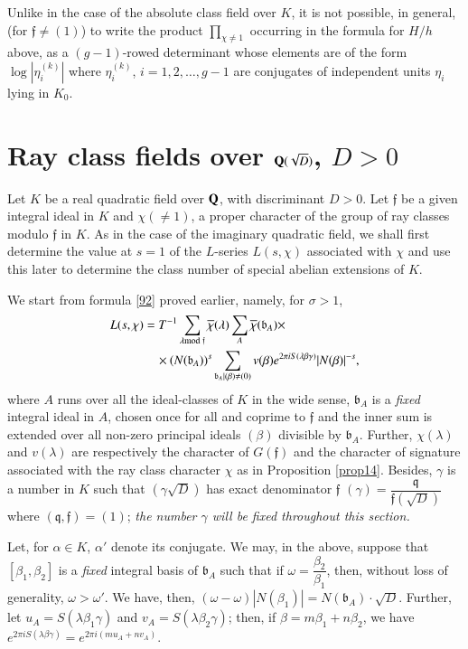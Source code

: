 Unlike in the case of the absolute class field over $K$, it is not
possible, in general, (for $\mathfrak{f}\neq (1)$) to write the
product $\prod\limits_{\chi\neq 1}$ occurring in the formula for $H/h$
above, as a $(g-1)$-rowed determinant whose elements are of the form
$\log|\eta^{(k)}_{i}|$ where $\eta^{(k)}_{i}$, $i=1,2,\ldots,g-1$ are
conjugates of independent units $\eta_{i}$ lying in $K_{0}$.

\section{Ray class fields over $\mathbf{Q}(\sqrt{D})$,
  $D>0$}\label{chap2:sec5}

Let $K$ be a real quadratic field over $\mathbf{Q}$, with discriminant
$D>0$. Let $\mathfrak{f}$ be a given integral ideal in $K$ and
$\chi(\neq 1)$, a proper character of the group of ray classes modulo
$\mathfrak{f}$ in $K$. As in the case of the imaginary quadratic
field, we shall first determine the value at $s=1$ of the $L$-series
$L(s,\chi)$ associated with $\chi$ and use this later to determine the
class number of special abelian extensions of $K$.

We start from formula \eqref{92} proved earlier, namely, for
$\sigma>1$,
\begin{align*}
L(s,\chi) &=
T^{-1}\sum_{\lambda\rm{mod} \;\mathfrak{f}}\overline{\chi}(\lambda)\sum_{A}\overline{\chi}(\mathfrak{b}_{A})\times\\
&\quad \times
(N(\mathfrak{b}_{A}))^{s}\sum_{\mathfrak{b}_{A}|(\beta)\neq
  (0)}v(\beta)e^{2\pi iS(\lambda\beta\gamma)}|N(\beta)|^{-s},
\end{align*}
where $A$ runs over all the ideal-classes of $K$ in the wide sense,
$\mathfrak{b}_{A}$ is a {\em fixed} integral ideal in $A$, chosen once
for all and coprime to $\mathfrak{f}$ and the inner sum is extended
over all non-zero principal ideals $(\beta)$ divisible by
$\mathfrak{b}_{A}$. Further, $\chi(\lambda)$ and $v(\lambda)$ are
respectively the character of $G(\mathfrak{f})$ and the character of
signature associated with the ray class character $\chi$ as in
Proposition \ref{prop14}. Besides, $\gamma$ is a number in $K$ such
that $(\gamma\sqrt{D})$ has exact denominator $\mathfrak{f}$ \ie
$(\gamma)=\dfrac{\mathfrak{q}}{\mathfrak{f}(\sqrt{D})}$ where
$(\mathfrak{q},\mathfrak{f})=(1)$; {\em the number $\gamma$ will be
  fixed throughout this section.}

Let, for $\alpha\in K$, $\alpha'$ denote its conjugate. We may, in the
above, suppose that $[\beta_{1},\beta_{2}]$ is a {\em fixed} integral
basis of $\mathfrak{b}_{A}$ such that if
$\omega=\dfrac{\beta_{2}}{\beta_{1}}$, then, without loss of
generality, $\omega>\omega'$. We have, then,
$(\omega-\omega)|N(\beta_{1})|=N(\mathfrak{b}_{A})\cdot\sqrt{D}$.\pageoriginale
Further, let $u_{A}=S(\lambda\beta_{1}\gamma)$ and
$v_{A}=S(\lambda\beta_{2}\gamma)$; then, if
$\beta=m\beta_{1}+n\beta_{2}$, we have $e^{2\pi
  iS(\lambda\beta\gamma)}=e^{2\pi i(mu_{A}+nv_{A})}$.

